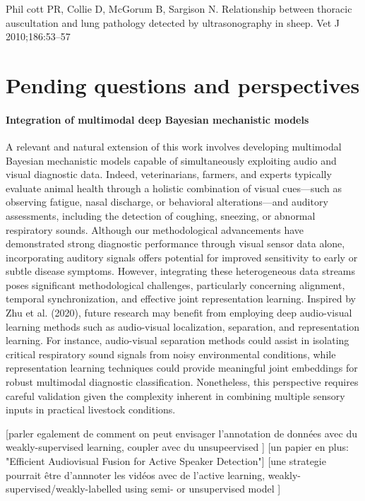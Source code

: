 Phil cott PR, Collie D, McGorum B, Sargison N. Relationship between thoracic auscultation and lung pathology detected by ultrasonography in sheep. Vet J 2010;186:53–57
\section{Pending questions and perspectives}



\paragraph{Integration of multimodal deep Bayesian mechanistic models} A relevant and natural extension of this work involves developing multimodal Bayesian mechanistic models capable of simultaneously exploiting audio and visual diagnostic data. Indeed, veterinarians, farmers, and experts typically evaluate animal health through a holistic combination of visual cues—such as observing fatigue, nasal discharge, or behavioral alterations—and auditory assessments, including the detection of coughing, sneezing, or abnormal respiratory sounds. Although our methodological advancements have demonstrated strong diagnostic performance through visual sensor data alone, incorporating auditory signals offers potential for improved sensitivity to early or subtle disease symptoms. However, integrating these heterogeneous data streams poses significant methodological challenges, particularly concerning alignment, temporal synchronization, and effective joint representation learning. Inspired by Zhu et al. (2020), future research may benefit from employing deep audio-visual learning methods such as audio-visual localization, separation, and representation learning. For instance, audio-visual separation methods could assist in isolating critical respiratory sound signals from noisy environmental conditions, while representation learning techniques could provide meaningful joint embeddings for robust multimodal diagnostic classification. Nonetheless, this perspective requires careful validation given the complexity inherent in combining multiple sensory inputs in practical livestock conditions.
 
[parler egalement de comment on peut envisager l'annotation de données avec du weakly-supervised learning, coupler avec du unsupeervised ]
[un papier en plus: "Efficient Audiovisual Fusion for Active Speaker Detection"]
[une strategie pourrait être d'annnoter les vidéos avec de l'active learning, weakly-supervised/weakly-labelled using semi- or unsupervised model ]

